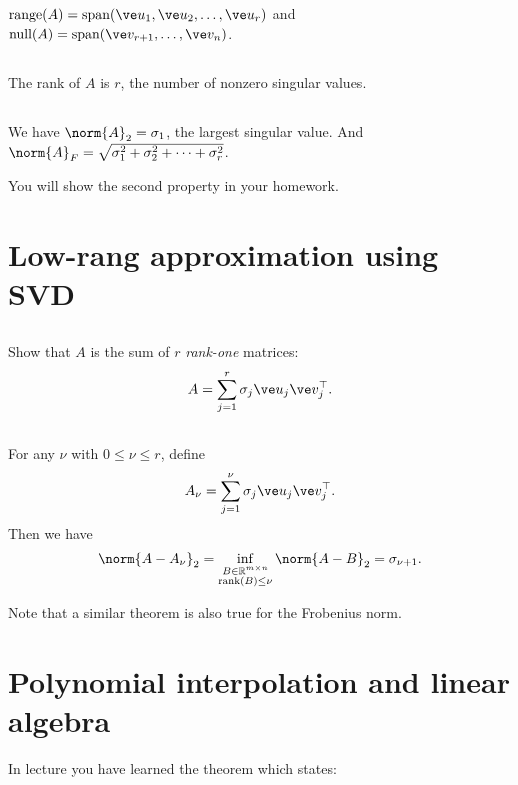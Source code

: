 \documentclass[11pt,letterpaper]{article}
\begin{document}
\subsection{}
$\text{range}(A) = \text{span}(\ve u_1,\ve u_2,\dots,\ve u_r)$ and $\text{null}(A) = \text{span}(\ve v_{r+1},\dots,\ve v_n)$. 

\subsection{}
The rank of $A$ is $r$, the number of nonzero singular values.

\subsection{}
We have $\norm{A}_2 = \sigma_1$, the largest singular value. And $\norm{A}_F = \sqrt{\sigma_1^2+\sigma_2^2+\dots+\sigma_r^2}$. 

You will show the second property in your homework.

\section{Low-rang approximation using SVD}
\subsection{}
Show that $A$ is the sum of $r$ \emph{rank-one} matrices:
\begin{align*}
    A = \sum_{j=1}^r \sigma_j \ve u_j \ve v_j^\top.
\end{align*}

\subsection{}
For any $\nu$ with $0\leq \nu \leq r$, define
\begin{align*}
    A_\nu = \sum_{j=1}^\nu \sigma_j \ve u_j \ve v_j^\top.
\end{align*}
Then we have
\begin{align*}
    \norm{A-A_\nu}_2 = \inf_{\substack{B\in\mathbb{R}^{m\times n}\\\text{rank}(B)\leq\nu}}\norm{A-B}_2 = \sigma_{\nu+1}.
\end{align*}

Note that a similar theorem is also true for the Frobenius norm.

\section{Polynomial interpolation and linear algebra}
In lecture you have learned the theorem which states:
\end{document}
